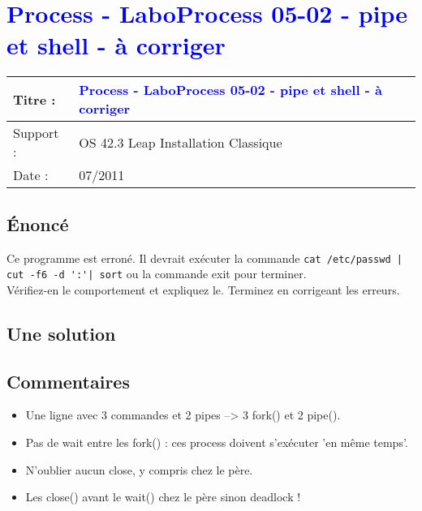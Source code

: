 \lstset{language=c}
\renewcommand{\titre}{\textcolor{blue}{ Process - LaboProcess 05-02 - pipe et shell - à corriger}}

\lhead{ \titre }
\section{{\titre} }

\begin{tabular}{|l|l|}
\hline
Titre : 	& \titre \\\hline
Support : 	& OS 42.3 Leap Installation Classique \\\hline
Date :		& 07/2011 \\\hline
\end{tabular}

\subsection{Énoncé}

Ce programme est erroné. Il devrait exécuter la commande \verb+cat /etc/passwd | cut -f6 -d ':'| sort+ ou la commande exit pour terminer.\\
Vérifiez-en le comportement et expliquez le. Terminez en corrigeant les erreurs.

\subsection{Une solution}



\subsection{Commentaires}

\begin{itemize}
\item Une ligne avec 3 commandes et 2 pipes --> 3 fork() et 2 pipe().
\item Pas de wait entre les fork() : ces process doivent s'exécuter 'en même temps'.
\item N'oublier aucun close, y compris chez le père.
\item Les close() avant le wait() chez le père sinon deadlock !
\end{itemize}
\newpage
